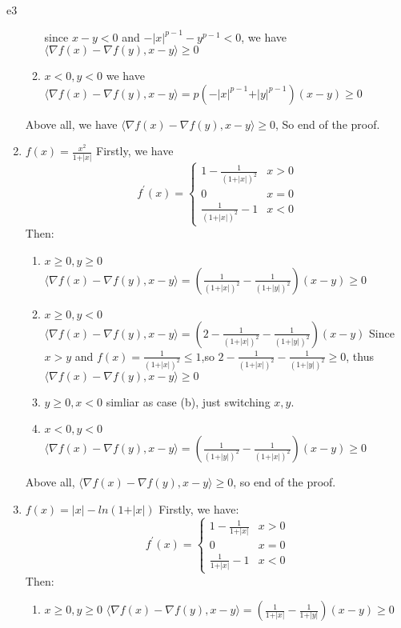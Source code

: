 \documentclass{article}
\begin{document}
\begin{PROOF}{e3}
\begin{enumerate}
\begin{enumerate}
		since $x-y<0$ and $-\vert x\vert ^{p-1}-y^{p-1}<0$, we have $\langle\nabla f(x)-\nabla f(y),x-y\rangle\ge 0 $
		\item $x<0,y<0$
		we have $\langle\nabla f(x)-\nabla f(y),x-y\rangle=p(-\vert x\vert ^{p-1}+\vert y\vert ^{p-1})(x-y)\ge 0$
	\end{enumerate}
	Above all, we have $\langle\nabla f(x)-\nabla f(y),x-y\rangle\ge 0$, So end of the proof.
	\item $f(x)=\frac{x^2}{1+\vert x\vert}$
	Firstly, we have
	\begin{equation}
		f^{'}(x)=\begin{cases}
			1-\frac{1}{(1+\vert x\vert)^2}&x>0\\
			0&x=0\\
			\frac{1}{(1+\vert x\vert)^2}-1&x<0
		\end{cases}
	\end{equation}
	Then:
	\begin{enumerate}
		\item $x\ge 0,y\ge 0$
		$\langle\nabla f(x)-\nabla f(y),x-y\rangle=(\frac{1}{(1+\vert x\vert)^2}-\frac{1}{(1+\vert y\vert)^2})(x-y)\ge 0 $
		\item $x\ge 0,y<0$
		$\langle\nabla f(x)-\nabla f(y),x-y\rangle=(2-\frac{1}{(1+\vert x\vert)^2}-\frac{1}{(1+\vert y\vert)^2})(x-y)$
		Since $x>y$ and $f(x)=\frac{1}{(1+\vert x\vert)^2}\le 1$,so $2-\frac{1}{(1+\vert x\vert)^2}-\frac{1}{(1+\vert y\vert)^2}\ge 0$, thus $\langle\nabla f(x)-\nabla f(y),x-y\rangle\ge 0$
		\item $y\ge 0,x<0$ simliar as case (b), just switching $x,y$.
		\item $x<0,y<0$
		$\langle\nabla f(x)-\nabla f(y),x-y\rangle=(\frac{1}{(1+\vert y\vert)^2}-\frac{1}{(1+\vert x\vert)^2})(x-y)\ge 0$
	\end{enumerate}
	Above all, $\langle\nabla f(x)-\nabla f(y),x-y\rangle\ge 0$, so end of the proof.
	\item $f(x)=\vert x\vert -ln(1+\vert x\vert)$
	Firstly, we have:
	\begin{equation}
		f^{'}(x)=\begin{cases}
			1-\frac{1}{1+\vert x\vert}&x>0\\
			0&x=0\\
			\frac{1}{1+\vert x\vert}-1&x<0
		\end{cases}
	\end{equation}
	Then:
	\begin{enumerate}
		\item $x\ge 0,y\ge 0$
		$\langle\nabla f(x)-\nabla f(y),x-y\rangle=(\frac{1}{1+\vert x\vert}-\frac{1}{1+\vert y\vert})(x-y)\ge 0$

\end{enumerate}
\end{enumerate}
\end{PROOF}
\end{document}
